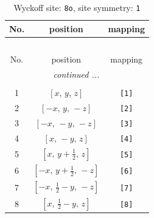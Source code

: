 \documentclass[fleqn,8pt]{jsarticle}
\begin{document}
\renewcommand{\arraystretch}{1.2}
\begin{longtable}{ccc}
\caption{Wyckoff site: {\tt 8o}, site symmetry: {\tt 1}}
 \\
 \hline \hline
No. & position & mapping \\ \hline \endfirsthead

\multicolumn{2}{l}{\tablename\ \thetable{}} \\
 \hline \hline
No. & position & mapping \\ \hline \endhead

 \hline \hline
\multicolumn{2}{r}{\footnotesize\it continued ...} \\ \endfoot

 \hline \hline
\multicolumn{2}{r}{} \\ \endlastfoot

1 & $\left[ x,\, y,\, z \right]$ & {\tt [1]} \\ \hline
2 & $\left[ - x,\, y,\, - z \right]$ & {\tt [2]} \\ \hline
3 & $\left[ - x,\, - y,\, - z \right]$ & {\tt [3]} \\ \hline
4 & $\left[ x,\, - y,\, z \right]$ & {\tt [4]} \\ \hline
5 & $\left[ x,\, y + \frac{1}{2},\, z \right]$ & {\tt [5]} \\ \hline
6 & $\left[ - x,\, y + \frac{1}{2},\, - z \right]$ & {\tt [6]} \\ \hline
7 & $\left[ - x,\, \frac{1}{2} - y,\, - z \right]$ & {\tt [7]} \\ \hline
8 & $\left[ x,\, \frac{1}{2} - y,\, z \right]$ & {\tt [8]} \\
\end{longtable}
\end{document}
